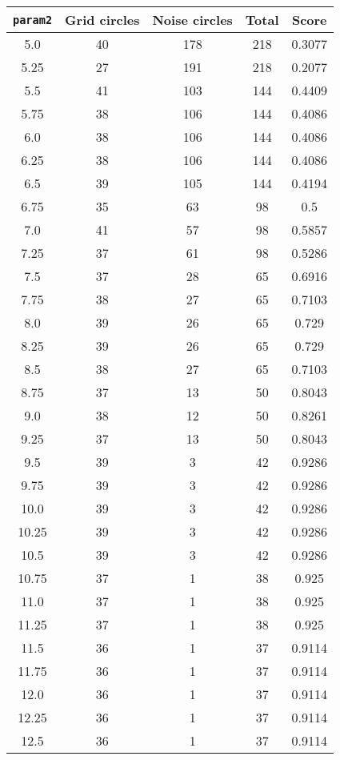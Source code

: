 \documentclass[letterpaper, 12pt]{article}
\begin{document}
\begin{longtable}{|c|c|c|c|c|}
\hline
\textbf{\texttt{param2}} & \textbf{Grid circles} & \textbf{Noise circles} & \textbf{Total} & \textbf{Score} \\
\hline
5.0 & 40 & 178 & 218 & 0.3077 \\
\hline
5.25 & 27 & 191 & 218 & 0.2077 \\
\hline
5.5 & 41 & 103 & 144 & 0.4409 \\
\hline
5.75 & 38 & 106 & 144 & 0.4086 \\
\hline
6.0 & 38 & 106 & 144 & 0.4086 \\
\hline
6.25 & 38 & 106 & 144 & 0.4086 \\
\hline
6.5 & 39 & 105 & 144 & 0.4194 \\
\hline
6.75 & 35 & 63 & 98 & 0.5 \\
\hline
7.0 & 41 & 57 & 98 & 0.5857 \\
\hline
7.25 & 37 & 61 & 98 & 0.5286 \\
\hline
7.5 & 37 & 28 & 65 & 0.6916 \\
\hline
7.75 & 38 & 27 & 65 & 0.7103 \\
\hline
8.0 & 39 & 26 & 65 & 0.729 \\
\hline
8.25 & 39 & 26 & 65 & 0.729 \\
\hline
8.5 & 38 & 27 & 65 & 0.7103 \\
\hline
8.75 & 37 & 13 & 50 & 0.8043 \\
\hline
9.0 & 38 & 12 & 50 & 0.8261 \\
\hline
9.25 & 37 & 13 & 50 & 0.8043 \\
\hline
9.5 & 39 & 3 & 42 & 0.9286 \\
\hline
9.75 & 39 & 3 & 42 & 0.9286 \\
\hline
10.0 & 39 & 3 & 42 & 0.9286 \\
\hline
10.25 & 39 & 3 & 42 & 0.9286 \\
\hline
10.5 & 39 & 3 & 42 & 0.9286 \\
\hline
10.75 & 37 & 1 & 38 & 0.925 \\
\hline
11.0 & 37 & 1 & 38 & 0.925 \\
\hline
11.25 & 37 & 1 & 38 & 0.925 \\
\hline
11.5 & 36 & 1 & 37 & 0.9114 \\
\hline
11.75 & 36 & 1 & 37 & 0.9114 \\
\hline
12.0 & 36 & 1 & 37 & 0.9114 \\
\hline
12.25 & 36 & 1 & 37 & 0.9114 \\
\hline
12.5 & 36 & 1 & 37 & 0.9114 \\

\end{longtable}
\end{document}
